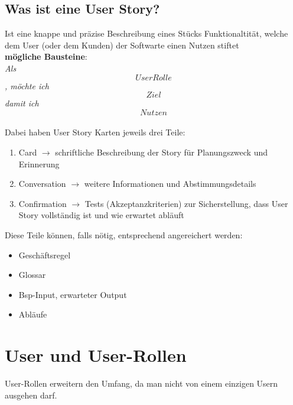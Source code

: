 \documentclass{report}
\theoremstyle{definition}
\theoremstyle{example}
\begin{document}
\subsection{Was ist eine User Story?}
Ist eine knappe und präzise Beschreibung eines Stücks Funktionaltität, welche dem User (oder dem Kunden) der Softwarte einen Nutzen stiftet\\
\textbf{mögliche Bausteine}:\\
\textit{Als \[User Rolle\], möchte ich \[Ziel\] damit ich \[Nutzen\]}\\

Dabei haben User Story Karten jeweils drei Teile:
\begin{enumerate}
	\item Card $\rightarrow$ schriftliche Beschreibung der Story für Planungszweck und Erinnerung
	\item Conversation $\rightarrow$ weitere Informationen und Abstimmungsdetails
	\item Confirmation $\rightarrow$ Tests (Akzeptanzkriterien) zur Sicherstellung, dass User Story vollständig ist und wie erwartet abläuft
\end{enumerate}
Diese Teile können, falls nötig, entsprechend angereichert werden:
\begin{itemize}
	\item Geschäftsregel
	\item Glossar
	\item Bsp-Input, erwarteter Output
	\item Abläufe
\end{itemize}

\section{User und User-Rollen}
User-Rollen erweitern den Umfang, da man nicht von einem einzigen Usern ausgehen darf. \\
\end{document}
